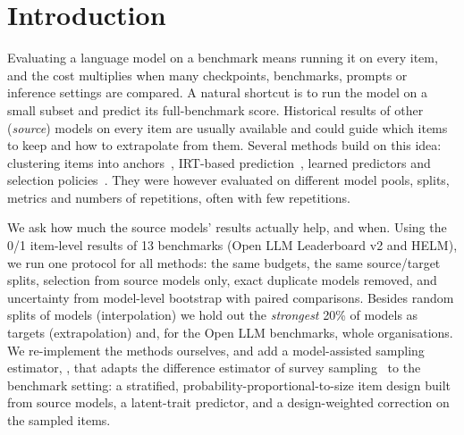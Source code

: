 \section{Introduction}
\label{sec:intro}
Evaluating a language model on a benchmark means running it on every item, and the cost multiplies when many checkpoints, benchmarks, prompts or inference settings are compared.
A natural shortcut is to run the model on a small subset and predict its full-benchmark score. Historical results of other (\emph{source}) models on every item are usually available and could guide which items to keep and how to extrapolate from them.
Several methods build on this idea: clustering items into anchors~\citep{vivek2024anchor}, IRT-based prediction~\citep{polo2024tiny,kipnis2025metabench}, learned predictors and selection policies~\citep{pacchiardi2024100,li2025active}. They were however evaluated on different model pools, splits, metrics and numbers of repetitions, often with few repetitions.

We ask how much the source models' results actually help, and when. Using the 0/1 item-level results of 13 benchmarks (Open LLM Leaderboard v2 and HELM), we run one protocol for all methods: the same budgets, the same source/target splits, selection from source models only, exact duplicate models removed, and uncertainty from model-level bootstrap with paired comparisons. Besides random splits of models (interpolation) we hold out the \emph{strongest} 20\% of models as targets (extrapolation) and, for the Open LLM benchmarks, whole organisations.
We re-implement the methods ourselves, and add a model-assisted sampling estimator, \mass{}, that adapts the difference estimator of survey sampling~\citep{sarndal1992model} to the benchmark setting: a stratified, probability-proportional-to-size item design built from source models, a latent-trait predictor, and a design-weighted correction on the sampled items.

